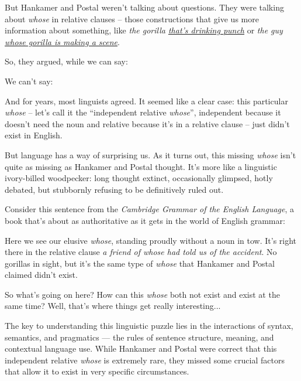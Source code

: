 \z

But Hankamer and Postal weren't talking about questions. They were talking about \textit{whose} in relative clauses -- those constructions that give us more information about something, like \textit{the gorilla \uline{that's drinking punch}} or \textit{the guy \uline{whose gorilla is making a scene}}.

So, they argued, while we can say:

\z

We can't say:

\z

And for years, most linguists agreed. It seemed like a clear case: this particular \textit{whose} -- let's call it the ``independent relative \textit{whose}'', independent because it doesn't need the noun and relative because it's in a relative clause -- just didn't exist in English.

But language has a way of surprising us. As it turns out, this missing \textit{whose} isn't quite as missing as Hankamer and Postal thought. It's more like a linguistic ivory-billed woodpecker: long thought extinct, occasionally glimpsed, hotly debated, but stubbornly refusing to be definitively ruled out.

Consider this sentence from the \textit{Cambridge Grammar of the English Language}, a book that's about as authoritative as it gets in the world of English grammar:

\z

Here we see our elusive \textit{whose}, standing proudly without a noun in tow. It's right there in the relative clause \textit{a friend of whose had told us of the accident}. No gorillas in sight, but it's the same type of \textit{whose} that Hankamer and Postal claimed didn't exist.

\bigskip

So what's going on here? How can this \textit{whose} both not exist and exist at the same time? Well, that's where things get really interesting...

The key to understanding this linguistic puzzle lies in the interactions of syntax, semantics, and pragmatics --- the rules of sentence structure, meaning, and contextual language use. While Hankamer and Postal were correct that this independent relative \textit{whose} is extremely rare, they missed some crucial factors that allow it to exist in very specific circumstances.

